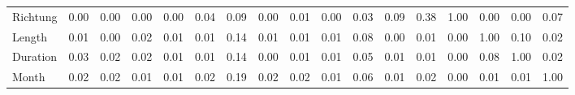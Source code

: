 \begin{tabular}{lrrrrrrrrrrrrrrrr}
Richtung &  0.00 &  0.00 &  0.00 &  0.00 &   0.04 &   0.09 & 0.00 &   0.01 &   0.00 & 0.03 & 0.09 &    0.38 &      1.00 &    0.00 &      0.00 &   0.07 \\
Length   &  0.01 &  0.00 &  0.02 &  0.01 &   0.01 &   0.14 & 0.01 &   0.01 &   0.01 & 0.08 & 0.00 &    0.01 &      0.00 &    1.00 &      0.10 &   0.02 \\
Duration &  0.03 &  0.02 &  0.02 &  0.01 &   0.01 &   0.14 & 0.00 &   0.01 &   0.01 & 0.05 & 0.01 &    0.01 &      0.00 &    0.08 &      1.00 &   0.02 \\
Month    &  0.02 &  0.02 &  0.01 &  0.01 &   0.02 &   0.19 & 0.02 &   0.02 &   0.01 & 0.06 & 0.01 &    0.02 &      0.00 &    0.01 &      0.01 &   1.00 \\
\bottomrule
\end{tabular}
